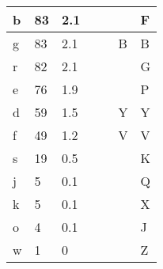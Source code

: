 \begin{table}[hbt]
\begin{tabular}{|l|l|l|l|l|l|l|}
        b         & 83     & 2.1           &                &                &                & F            \\ \hline
        g         & 83     & 2.1           &                &                & B              & B            \\ \hline
        r         & 82     & 2.1           &                &                &                & G            \\ \hline
        e         & 76     & 1.9           &                &                &                & P            \\ \hline
        d         & 59     & 1.5           &                &                & Y              & Y            \\ \hline
        f         & 49     & 1.2           &                &                & V              & V            \\ \hline
        s         & 19     & 0.5           &                &                &                & K            \\ \hline
        j         & 5      & 0.1           &                &                &                & Q            \\ \hline
        k         & 5      & 0.1           &                &                &                & X            \\ \hline
        o         & 4      & 0.1           &                &                &                & J            \\ \hline
        w         & 1      & 0             &                &                &                & Z            \\ \hline
        \end{tabular}
    \end{table}